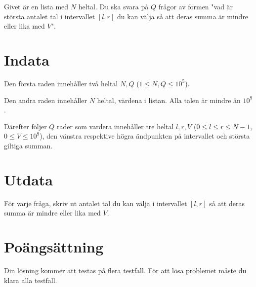 Givet är en lista med $N$ heltal. Du ska svara på $Q$ frågor av formen "vad är största antalet tal i intervallet $[l,r]$ du
kan välja så att deras summa är mindre eller lika med $V$".

\section*{Indata}
Den första raden innehåller två heltal $N,Q$ ($1 \leq N,Q \leq 10^5$).

Den andra raden innehåller $N$ heltal, värdena i listan. Alla talen är mindre än $10^9$.

Därefter följer $Q$ rader som vardera innehåller tre heltal $l, r, V$ ($0 \leq l \leq r \leq N-1$, $0 \leq V \leq 10^9$),
den vänstra respektive högra ändpunkten på intervallet och största giltiga summan.

\section*{Utdata}
För varje fråga, skriv ut antalet tal du kan välja i intervallet $[l,r]$ så att deras summa är mindre eller lika med $V$.

\section*{Poängsättning}
Din lösning kommer att testas på flera testfall.
\noindent
För att lösa problemet måste du klara alla testfall.
